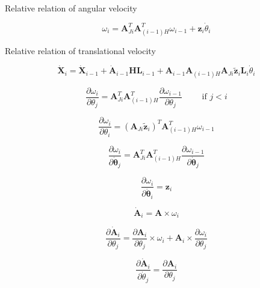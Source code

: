\documentclass{article}
\begin{document}
Relative relation of angular velocity

\begin{equation}
\omega_i = \mathbf{A}^T_{Ji}\mathbf{A}^T_{(i-1)H}\omega_{i-1}+\mathbf{z}_i\dot{\theta}_i
\end{equation}

Relative relation of translational velocity

\begin{equation}
\mathbf{\dot X}_i=\mathbf{\dot X}_{i-1}+\mathbf{\dot A}_{i-1}\mathbf{HL}_{i-1}+\mathbf{A}_{i-1}
\mathbf{A}_{(i-1)H}\mathbf{A}_{Ji}\tilde{\mathbf z}_i\mathbf{L}_i\dot{\theta}_i
\end{equation}

\begin{equation}
\frac{\partial \omega_i}{\partial \theta_j}
=\mathbf{A}^T_{Ji}\mathbf{A}^T_{(i-1)H}
\frac{\partial \omega_{i-1}}{\partial \theta_j}
	\qquad \textrm{  if  } j < i
\end{equation}

\begin{equation}
\frac{\partial \omega_i}{\partial \theta_i} =
(\mathbf{A}_{Ji}\tilde{\mathbf z}_i)^T\mathbf{A}^T_{(i-1)H}\omega_{i-1}
\end{equation}

\begin{equation}
\frac{\partial \omega_i}{\partial \dot{\mathbf \theta}_j} = \mathbf{A}^T_{Ji}\mathbf{A}^T_{(i-1)H}
\frac{\partial \omega_{i-1}}{\partial \dot{\mathbf \theta}_j}
\end{equation}

\begin{equation}
\frac{\partial \omega_i}{\partial \dot{\mathbf \theta}_i} = \mathbf{z}_i
\end{equation}

\begin{displaymath}
\dot{\mathbf A}_i = \mathbf{A}\times\omega_i
\end{displaymath}

\begin{equation}
\frac{\partial \mathbf{\dot A}_i}{\partial \theta_j}=\frac{\partial \mathbf{A}_i}{\partial \theta_j}\times\omega_i
+\mathbf{A}_i\times\frac{\partial \omega_i}{\partial \theta_j}
\end{equation}

\begin{equation}
\frac{\partial \mathbf{\dot A}_i}{\partial \dot{\theta}_j}
=\frac{\partial \mathbf{A}_i}{\partial \theta_j}
\end{equation}
\end{document}
